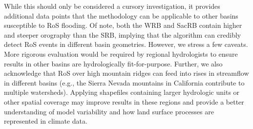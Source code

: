 \documentclass{article}
\begin{document}
While this should only be considered a cursory investigation, it provides additional data points that the methodology can be applicable to other basins susceptible to RoS flooding.
Of note, both the WRB and SacRB contain higher and steeper orography than the SRB, implying that the algorithm can credibly detect RoS events in different basin geometries.
However, we stress a few caveats. More rigorous evaluation would be required by regional hydrologists to ensure results in other basins are hydrologically fit-for-purpose.
Further, we also acknowledge that RoS over high mountain ridges can feed into rises in streamflow in different basins (e.g., the Sierra Nevada mountains in California contribute to multiple watersheds).
Applying shapefiles containing larger hydrologic units or other spatial coverage may improve results in these regions and provide a better understanding of model variability and how land surface processes are represented in climate data.


 
\end{document}
